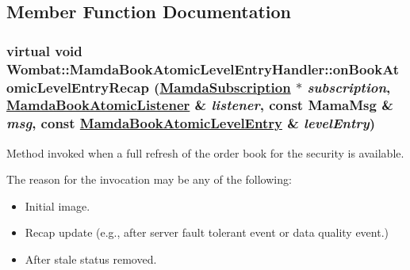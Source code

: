 \subsection{Member Function Documentation}
\hypertarget{classWombat_1_1MamdaBookAtomicLevelEntryHandler_f0b3d4101df368122f799f2f55793c3a}{
\subsubsection[onBookAtomicLevelEntryRecap]{\setlength{\rightskip}{0pt plus 5cm}virtual void Wombat::Mamda\-Book\-Atomic\-Level\-Entry\-Handler::on\-Book\-Atomic\-Level\-Entry\-Recap (\hyperlink{classWombat_1_1MamdaSubscription}{Mamda\-Subscription} $\ast$ {\em subscription}, \hyperlink{classWombat_1_1MamdaBookAtomicListener}{Mamda\-Book\-Atomic\-Listener} \& {\em listener}, const Mama\-Msg \& {\em msg}, const \hyperlink{classWombat_1_1MamdaBookAtomicLevelEntry}{Mamda\-Book\-Atomic\-Level\-Entry} \& {\em level\-Entry})}}
\label{classWombat_1_1MamdaBookAtomicLevelEntryHandler_f0b3d4101df368122f799f2f55793c3a}


Method invoked when a full refresh of the order book for the security is available. 

The reason for the invocation may be any of the following:\begin{itemize}
\item Initial image.\item Recap update (e.g., after server fault tolerant event or data quality event.)\item After stale status removed.\end{itemize}



